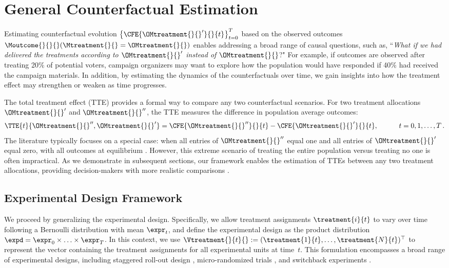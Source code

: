 \section{General Counterfactual Estimation}
\label{sec:Causal_Estimands}
% 
Estimating counterfactual evolution $\left\{ \CFE{\OMtreatment{}{}'}{}{t} \right\}_{t=0}^T$ based on the observed outcomes $\Moutcome{}{}{}(\Mtreatment{}{} = \OMtreatment{}{})$ enables addressing a broad range of causal questions, such as, “\emph{What if we had delivered the treatments according to $\OMtreatment{}{}'$ instead of $\OMtreatment{}{}$}?" For example, if outcomes are observed after treating 20\% of potential voters, campaign organizers may want to explore how the population would have responded if 40\% had received the campaign materials. In addition, by estimating the dynamics of the counterfactuals over time, we gain insights into how the treatment effect may strengthen or weaken as time progresses.

The total treatment effect (TTE) provides a formal way to compare any two counterfactual scenarios. For two treatment allocations $\OMtreatment{}{}'$ and $\OMtreatment{}{}''$, the TTE measures the difference in population average outcomes:
% 
\begin{align}
    \label{eq:TTE_def}
    \TTE{t}{\OMtreatment{}{}'',\OMtreatment{}{}'} = \CFE{\OMtreatment{}{}''}{}{t} - \CFE{\OMtreatment{}{}'}{}{t},
    \quad\quad\quad
    t = 0,1, \ldots, T\,.
\end{align}
%
The literature typically focuses on a special case: when all entries of $\OMtreatment{}{}''$ equal one and all entries of $\OMtreatment{}{}'$ equal zero, with all outcomes at equilibrium \citep{yu2022estimating,candogan2023correlated,ni2023design,ugander2023randomized}. However, this extreme scenario of treating the entire population versus treating no one is often impractical. As we demonstrate in subsequent sections, our framework enables the estimation of TTEs between any two treatment allocations, providing decision-makers with more realistic comparisons \citep{muralidharan2017experimentation,egger2022general}.


\subsection{Experimental Design Framework}
\label{sec:Experimental_Design}
% 
We proceed by generalizing the experimental design. Specifically, we allow treatment assignments $\treatment{i}{t}$ to vary over time following a Bernoulli distribution with mean $\expr_t$, and define the experimental design as the product distribution $\expd = \expr_0 \times \ldots \times \expr_T$. In this context, we use $\Vtreatment{}{t}{} := (\treatment{1}{t}, \ldots, \treatment{N}{t})^\top$ to represent the vector containing the treatment assignments for all experimental units at time~$t$. This formulation encompasses a broad range of experimental designs, including staggered roll-out design \citep{xiong2024optimal}, micro-randomized trials \citep{li2022network}, and switchback experiments \citep{bojinov2023design}.

